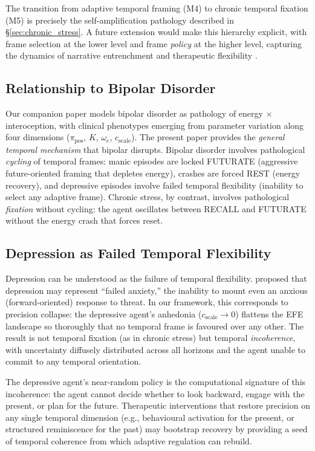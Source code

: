 \documentclass[11pt,a4paper]{article}
\begin{document}
The transition from adaptive temporal framing (M4) to chronic temporal fixation (M5) is precisely the self-amplification pathology described in \S\ref{sec:chronic_stress}. A future extension would make this hierarchy explicit, with frame selection at the lower level and frame \emph{policy} at the higher level, capturing the dynamics of narrative entrenchment and therapeutic flexibility \citep{hein2022emotion}.

\subsection{Relationship to Bipolar Disorder}\label{sec:bipolar_connection}

Our companion paper \citep{albarracin2026bipolar} models bipolar disorder as pathology of energy $\times$ interoception, with clinical phenotypes emerging from parameter variation along four dimensions ($\pi_{\text{pos}}$, $K$, $\omega_e$, $c_{\text{scale}}$). The present paper provides the \emph{general temporal mechanism} that bipolar disrupts. Bipolar disorder involves pathological \emph{cycling} of temporal frames: manic episodes are locked FUTURATE (aggressive future-oriented framing that depletes energy), crashes are forced REST (energy recovery), and depressive episodes involve failed temporal flexibility (inability to select any adaptive frame). Chronic stress, by contrast, involves pathological \emph{fixation} without cycling: the agent oscillates between RECALL and FUTURATE without the energy crash that forces reset.

\subsection{Depression as Failed Temporal Flexibility}\label{sec:depression}

Depression can be understood as the failure of temporal flexibility. \citet{krupnik2021depression} proposed that depression may represent ``failed anxiety,'' the inability to mount even an anxious (forward-oriented) response to threat. In our framework, this corresponds to precision collapse: the depressive agent's anhedonia ($c_{\text{scale}} \to 0$) flattens the EFE landscape so thoroughly that no temporal frame is favoured over any other. The result is not temporal fixation (as in chronic stress) but temporal \emph{incoherence}, with uncertainty diffusely distributed across all horizons and the agent unable to commit to any temporal orientation.

The depressive agent's near-random policy is the computational signature of this incoherence: the agent cannot decide whether to look backward, engage with the present, or plan for the future. Therapeutic interventions that restore precision on any single temporal dimension (e.g., behavioural activation for the present, or structured reminiscence for the past) may bootstrap recovery by providing a seed of temporal coherence from which adaptive regulation can rebuild.
\end{document}
